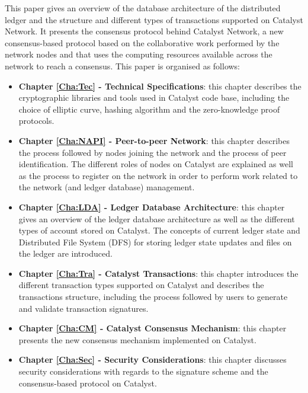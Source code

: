 This paper gives an overview of the database architecture of the distributed ledger and the structure and different types of transactions supported on Catalyst Network. It presents the consensus protocol behind Catalyst Network, a new consensus-based protocol based on the collaborative work performed by the network nodes and that uses the computing resources available across the network to reach a consensus. This paper is organised as follows:

\begin{itemize}
\item \textbf{Chapter \ref{Cha:Tec} - Technical Specifications}: this chapter describes the cryptographic libraries and tools used in Catalyst code base, including the choice of elliptic curve, hashing algorithm and the zero-knowledge proof protocols. 

\item \textbf{Chapter \ref{Cha:NAPI} - Peer-to-peer Network}: this chapter describes the process followed by nodes joining the network and the process of peer identification. The different roles of nodes on Catalyst are explained as well as the process to register on the network in order to perform work related to the network (and ledger database) management. 

\item \textbf{Chapter \ref{Cha:LDA} - Ledger Database Architecture}: this chapter gives an overview of the ledger database architecture as well as the different types of account stored on Catalyst. The concepts of current ledger state and Distributed File System (DFS) for storing ledger state updates and files on the ledger are introduced. 

\item \textbf{Chapter \ref{Cha:Tra} - Catalyst Transactions}: this chapter introduces the different transaction types supported on Catalyst and describes the transactions structure, including the process followed by users to generate and validate transaction signatures. 

\item \textbf{Chapter \ref{Cha:CM} - Catalyst Consensus Mechanism}: this chapter presents the new consensus mechanism implemented on Catalyst. 



\item \textbf{Chapter \ref{Cha:Sec} - Security Considerations}: this chapter discusses security considerations with regards to the signature scheme and the consensus-based protocol on Catalyst. 

\end{itemize}